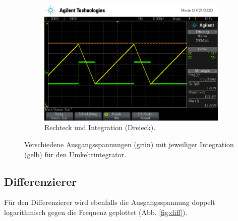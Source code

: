 \begin{figure}
\begin{subfigure}{0.48\textwidth}
                    \end{subfigure}
                    \begin{subfigure}{0.48\textwidth}
                        \centering
                        \includegraphics[width=\textwidth]{scope_6.png}%
                        \caption{Rechteck und Integration (Dreieck).}
                        \label{fig:TU}
                    \end{subfigure}
                    \caption{Verschiedene Ausgangsspannungen (grün) mit jeweiliger Integration (gelb) für den Umkehrintegrator.}
                    \label{fig:dreiint}
                \end{figure}



        \subsection{Differenzierer}

            Für den Differenzierer wird ebenfalls die Ausgangsspannung doppelt logarithmisch gegen die Frequenz 
            geplottet (Abb. \ref{fig:diff}).

